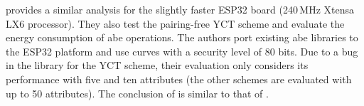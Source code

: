 \cite{girgenti_feasibility_2019} provides a similar analysis for the slightly faster ESP32 board (240\,MHz Xtensa LX6 processor).
They also test the pairing-free YCT scheme \cite{yao_lightweight_2015} and evaluate the energy consumption of \acrshort{abe} operations.
The authors port existing \acrshort{abe} libraries to the ESP32 platform and use curves with a security level of 80 bits.
Due to a bug in the library for the YCT scheme, their evaluation only considers its performance with five and ten attributes (the other schemes are evaluated with up to 50 attributes).
The conclusion of \cite{girgenti_feasibility_2019} is similar to that of \cite{borgh_attribute-based_2016}. 